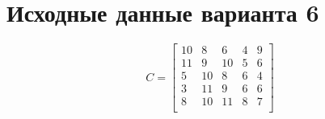 \section{Исходные данные варианта 6}

\begin{equation}
	C = \begin{bmatrix}
		10 &  8 &  6 &  4 &  9 \\
		11 &  9 & 10 &  5 &  6 \\
		 5 & 10 &  8 &  6 &  4 \\
		 3 & 11 &  9 &  6 &  6 \\
		 8 & 10 & 11 &  8 &  7 \\
	\end{bmatrix}
\end{equation}